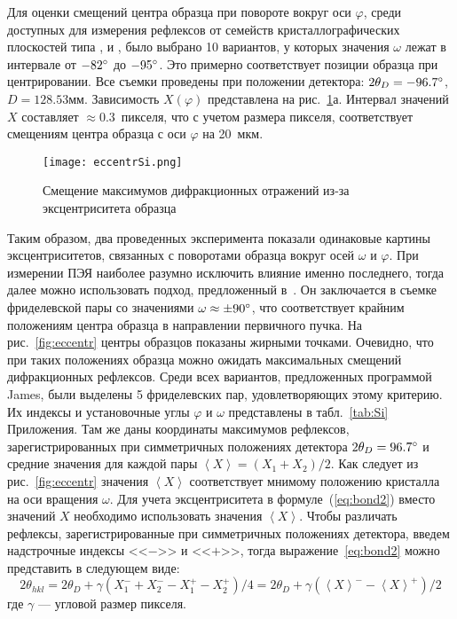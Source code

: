 Для оценки смещений центра образца при повороте вокруг оси $\varphi$, среди доступных для измерения рефлексов от семейств кристаллографических плоскостей типа ,  и , было выбрано 10 вариантов, у которых значения $\omega$ лежат в интервале от $-82^\circ$ до $-95^\circ$.
Это примерно соответствует позиции образца при центрировании.
Все съемки проведены при положении детектора: $2\theta_D = -96.7^\circ$, $D = 128.53\unit{мм}$.
Зависимость $X(\varphi)$ представлена на рис.~\ref{fig:eccentrSi}а.
Интервал значений $X$ составляет $\approx 0.3$~пикселя, что с учетом размера пикселя, соответствует смещениям центра образца с оси $\varphi$ на 20~мкм.

\begin{figure}[ht!]
    \centering
    \texttt{[image: eccentrSi.png]}
    \caption{Смещение максимумов дифракционных отражений из-за эксцентриситета образца}%
    \label{fig:eccentrSi}
\end{figure}

Таким образом, два проведенных эксперимента показали одинаковые картины эксцентриситетов, связанных с поворотами образца вокруг осей $\omega$ и $\varphi$.
При измерении ПЭЯ наиболее разумно исключить влияние именно последнего, тогда далее можно использовать подход, предложенный в~\cite{Ponomarev:1969}.
Он заключается в съемке фриделевской пары со значениями $\omega \approx \pm 90^\circ$, что соответствует крайним положениям центра образца в направлении первичного пучка.
На рис.~\ref{fig:eccentr} центры образцов показаны жирными точками.
Очевидно, что при таких положениях образца можно ожидать максимальных смещений дифракционных рефлексов.
Среди всех вариантов, предложенных программой James, были выделены 5 фриделевских пар, удовлетворяющих этому критерию.
Их индексы и установочные углы $\varphi$ и $\omega$ представлены в табл.~\ref{tab:Si} Приложения.
Там же даны координаты максимумов рефлексов, зарегистрированных при симметричных положениях детектора $2\theta_D = 96.7^\circ$ и средние значения для каждой пары $\left<X\right> = (X_1 + X_2) / 2$.
Как следует из рис.~\ref{fig:eccentr} значения $\left<X\right>$ соответствует мнимому положению кристалла на оси вращения $\omega$.
Для учета эксцентриситета в формуле~(\ref{eq:bond2}) вместо значений $X$ необходимо использовать значения $\left<X\right>$.
Чтобы различать рефлексы, зарегистрированные при симметричных положениях детектора, введем надстрочные индексы <<$-$>> и <<$+$>>, тогда выражение~\ref{eq:bond2} можно представить в следующем виде:
\begin{equation}\label{eq:bond4}
    2\theta_{hkl} = 2\theta_D + \gamma (X_1^- + X_2^- - X_1^+ - X_2^+) / 4 = 2\theta_D + \gamma (\left<X\right>^- - \left<X\right>^+) / 2
\end{equation}
где $\gamma$ --- угловой размер пикселя.

